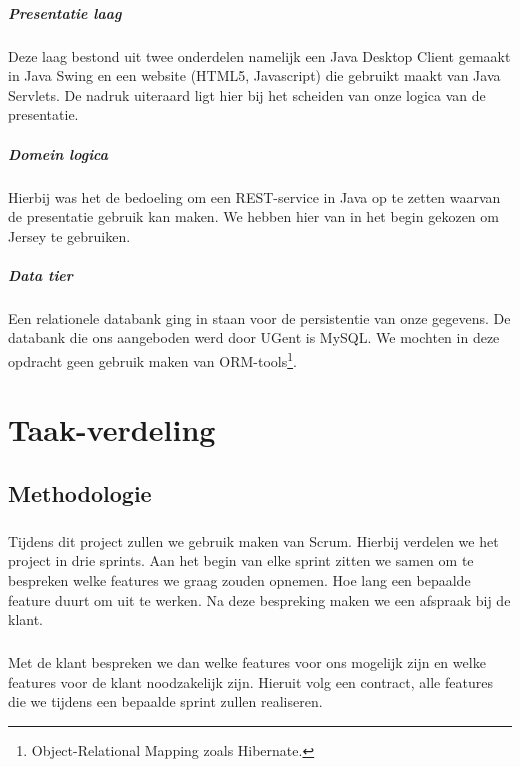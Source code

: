 \documentclass[pdftex,a4paper,12pt,twoside]{report}
\begin{document}
\paragraph{Presentatie laag}
Deze laag bestond uit twee onderdelen namelijk een Java Desktop Client gemaakt in Java Swing en een website (HTML5, Javascript) die gebruikt maakt van Java Servlets. De nadruk uiteraard ligt hier bij het scheiden van onze logica van de presentatie.

\paragraph{Domein logica}
Hierbij was het de bedoeling om een REST-service in Java op te zetten waarvan de presentatie gebruik kan maken. We hebben hier van in het begin gekozen om Jersey te gebruiken.

\paragraph{Data tier}
Een relationele databank ging in staan voor de persistentie van onze gegevens. De databank die ons aangeboden werd door UGent is MySQL. We mochten in deze opdracht geen gebruik maken van ORM-tools\footnote{Object-Relational Mapping zoals Hibernate.}. 

\chapter{Taak-verdeling}

\section{Methodologie}
\paragraph{}
Tijdens dit project zullen we gebruik maken van Scrum. Hierbij verdelen we het project in drie sprints. Aan het begin van elke sprint zitten we samen om te bespreken welke features we graag zouden opnemen. Hoe lang een bepaalde feature duurt om uit te werken. Na deze bespreking maken we een afspraak bij de klant.

\paragraph{}
Met de klant bespreken we dan welke features voor ons mogelijk zijn en welke features voor de klant noodzakelijk zijn. Hieruit volg een contract, alle features die we tijdens een bepaalde sprint zullen realiseren.
\end{document}
